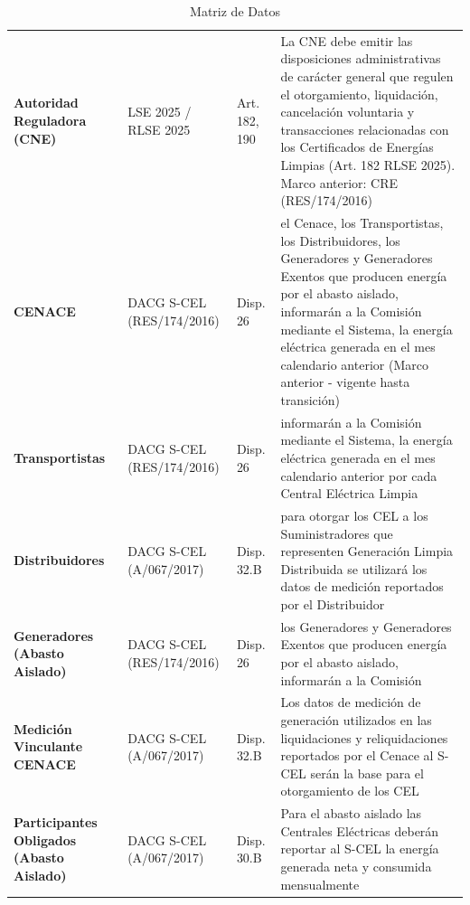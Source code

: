 \documentclass{cel}
\begin{document}
\vspace{0.3cm}
\begin{tabladoradoLargo}
\renewcommand{\tabularxcolumn}[1]{p{#1}}
\begin{xltabular}{\textwidth}{|X|X|X|X|}
\caption{Matriz de Datos} \\
\toprule
{}  &  &  &  \\
\midrule
\endhead
\textbf{Autoridad Reguladora (CNE)} & LSE 2025 / RLSE 2025 & Art. 182, 190 & \textquotedbl{}La CNE debe emitir las disposiciones administrativas de carácter general que regulen el otorgamiento, liquidación, cancelación voluntaria y transacciones relacionadas con los Certificados de Energías Limpias\textquotedbl{} (Art. 182 RLSE 2025). Marco anterior: CRE (RES/174/2016) \\ \hline
\textbf{CENACE} & DACG S-CEL (RES/174/2016) & Disp. 26 & \textquotedbl{}el Cenace, los Transportistas, los Distribuidores, los Generadores y Generadores Exentos que producen energía por el abasto aislado, informarán a la Comisión mediante el Sistema, la energía eléctrica generada en el mes calendario anterior\textquotedbl{} (Marco anterior - vigente hasta transición) \\ \hline
\textbf{Transportistas} & DACG S-CEL (RES/174/2016) & Disp. 26 & \textquotedbl{}informarán a la Comisión mediante el Sistema, la energía eléctrica generada en el mes calendario anterior por cada Central Eléctrica Limpia\textquotedbl{} \\ \hline
\textbf{Distribuidores} & DACG S-CEL (A/067/2017) & Disp. 32.B & \textquotedbl{}para otorgar los CEL a los Suministradores que representen Generación Limpia Distribuida se utilizará los datos de medición reportados por el Distribuidor\textquotedbl{} \\ \hline
\textbf{Generadores (Abasto Aislado)} & DACG S-CEL (RES/174/2016) & Disp. 26 & \textquotedbl{}los Generadores y Generadores Exentos que producen energía por el abasto aislado, informarán a la Comisión\textquotedbl{} \\ \hline
\textbf{Medición Vinculante CENACE} & DACG S-CEL (A/067/2017) & Disp. 32.B & \textquotedbl{}Los datos de medición de generación utilizados en las liquidaciones y reliquidaciones reportados por el Cenace al S-CEL serán la base para el otorgamiento de los CEL\textquotedbl{} \\ \hline
\textbf{Participantes Obligados (Abasto Aislado)} & DACG S-CEL (A/067/2017) & Disp. 30.B & \textquotedbl{}Para el abasto aislado las Centrales Eléctricas deberán reportar al S-CEL la energía generada neta y consumida mensualmente\textquotedbl{} \\ \hline
\bottomrule
\end{xltabular}
\end{tabladoradoLargo}
\end{document}
